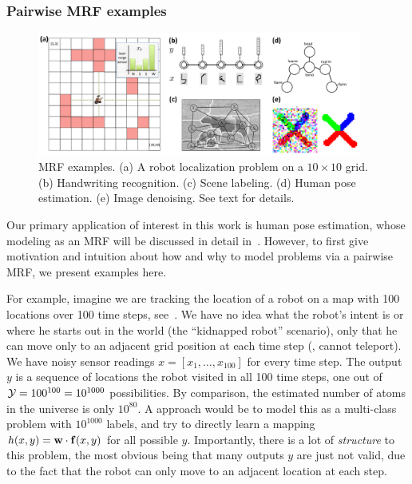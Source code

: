 \subsubsection{Pairwise MRF examples}
\begin{figure}[tb]
\begin{center}
\includegraphics[width=0.95\textwidth]{figs/mrf-examples.pdf}
\caption[MRF examples]{MRF examples.  (a) A robot localization problem on a $10 
\times 10$ grid. (b) Handwriting recognition.  (c) Scene labeling.  (d) Human 
pose estimation.  (e) Image denoising. See text for details. }
\label{fig:mrf-examples}
\end{center}
\end{figure}



Our primary application of interest in this work is human pose estimation, 
whose modeling as an MRF will be discussed in detail in~.  However, 
to first give motivation and intuition about how and why to model problems via 
a pairwise MRF, we present examples here.

For example, imagine we are tracking the location of a robot on a map with 100 
locations over 100 time steps, see~.  We have no idea 
what the robot's intent is or where he starts out in the world (the ``kidnapped 
robot'' scenario), only that he can move only to an adjacent grid position at 
each time step (\ie, cannot teleport).  We have noisy sensor readings $x = 
[x_1,\ldots,x_{100}]$ for every time step.  The output $y$ is a sequence of 
locations the robot visited in all 100 time steps, one out of $\mathcal{Y} = 100^{100} 
= 10^{1000}$ possibilities.  By comparison, the estimated number of atoms in 
the universe is only $10^{80}$.  A \naive approach would be to model this as a 
multi-class problem with $10^{1000}$ labels, and try to directly learn a 
mapping $h(x,y) = \mathbf{w} \cdot \mathbf{f}(x,y)$ for all possible $y$.  Importantly, there 
is a lot of {\em structure} to this problem, the most obvious being that many 
outputs $y$ are just not valid, due to the fact that the robot can only move to 
an adjacent location at each step.

